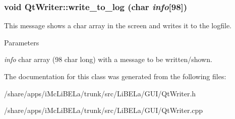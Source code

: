 \hypertarget{classQtWriter_a99f6265ac316c3a98bc295bcfb44485a}{
\subsubsection[{write\_\-to\_\-log}]{\setlength{\rightskip}{0pt plus 5cm}void QtWriter::write\_\-to\_\-log (char {\em info}\mbox{[}98\mbox{]})}}
\label{classQtWriter_a99f6265ac316c3a98bc295bcfb44485a}
This message shows a char array in the screen and writes it to the logfile. 
\begin{DoxyParams}{Parameters}
\item[{\em info}]char array (98 char long) with a message to be written/shown. \end{DoxyParams}


The documentation for this class was generated from the following files:\begin{DoxyCompactItemize}
\item 
/share/apps/iMcLiBELa/trunk/src/LiBELa/GUI/QtWriter.h\item 
/share/apps/iMcLiBELa/trunk/src/LiBELa/GUI/QtWriter.cpp\end{DoxyCompactItemize}

